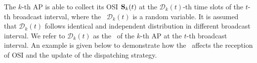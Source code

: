 
The $k$-th AP is able to collect its OSI $\mathbf{S}_{k}(t)$ at the $\mathcal{D}_{k}(t)$-th time slots of the $t$-th broadcast interval, where the \brlatency~$\mathcal{D}_{k}(t)$ is a random variable.
It is assumed that $\mathcal{D}_{k}(t)$ follows identical and independent distribution in different broadcast interval.
We refer to $\mathcal{D}_{k}(t)$ as the \brlatency~of the $k$-th AP at the $t$-th broadcast interval.
An example is given below to demonstrate how the \brlatency~affects the reception of OSI and the update of the dispatching strategy.

